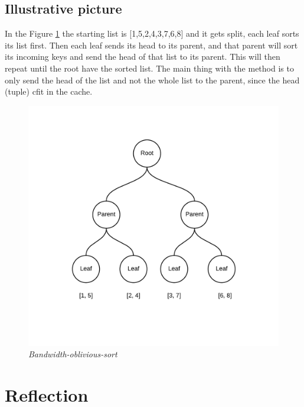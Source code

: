 \documentclass[a4paper,12pt]{article}
\begin{document}
\newpage

\subsection{Illustrative picture}
In the Figure \ref{fig:flock-pic} the starting list is [1,5,2,4,3,7,6,8] and it gets split, each leaf sorts its list first. Then each leaf sends its head to its parent, and that parent will sort its incoming  keys and send the head of that list to its parent.
This will then repeat until the root have the sorted list. The main thing with the method is to only send the head of the list and not the whole list to the parent, since the head (tuple) cfit in the cache.

\begin{figure}[h!]
\includegraphics{bandwidth-oblivious-sort}
\caption{\emph{Bandwidth-oblivious-sort}}
\label{fig:flock-pic}
\end{figure}

\section{Reflection}
\end{document}
